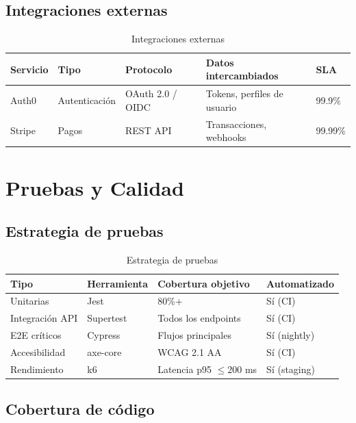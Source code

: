 \documentclass[a4paper,11pt,spanish]{article}
\begin{document}
\subsection{Integraciones externas}

\begin{table}[H]
\centering
\caption{Integraciones externas}
\label{tab:integraciones}
\begin{tabular}{@{}lllll@{}}
\toprule
\textbf{Servicio} & \textbf{Tipo} & \textbf{Protocolo} & \textbf{Datos intercambiados} & \textbf{SLA} \\
\midrule
Auth0 & Autenticación & OAuth 2.0 / OIDC & Tokens, perfiles de usuario & 99.9\% \\
Stripe & Pagos & REST API & Transacciones, webhooks & 99.99\% \\
\bottomrule
\end{tabular}
\end{table}

\newpage

\section{Pruebas y Calidad}

\subsection{Estrategia de pruebas}

\begin{table}[H]
\centering
\caption{Estrategia de pruebas}
\label{tab:pruebas}
\begin{tabular}{@{}llll@{}}
\toprule
\textbf{Tipo} & \textbf{Herramienta} & \textbf{Cobertura objetivo} & \textbf{Automatizado} \\
\midrule
Unitarias & Jest & 80\%+ & Sí (CI) \\
Integración API & Supertest & Todos los endpoints & Sí (CI) \\
E2E críticos & Cypress & Flujos principales & Sí (nightly) \\
Accesibilidad & axe-core & WCAG 2.1 AA & Sí (CI) \\
Rendimiento & k6 & Latencia p95 $\le$200 ms & Sí (staging) \\
\bottomrule
\end{tabular}
\end{table}

\subsection{Cobertura de código}
\end{document}
